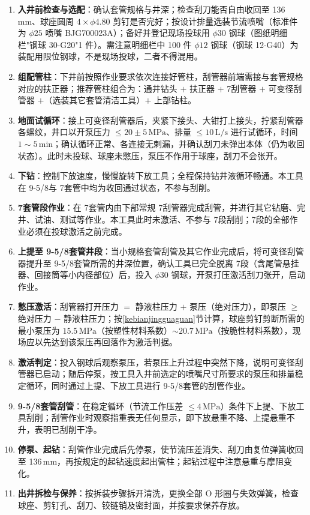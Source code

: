 \begin{enumerate}[label=(\arabic*),leftmargin=2em,itemsep=2pt]
	\item \textbf{入井前检查与选配}：确认套管规格与井深；检查刮刀能否自由收回至 136\,mm、球座圆周 $4\times\phi 4.80$ 剪钉是否完好；按设计排量选装节流喷嘴（标准件为 $\phi 25$ 喷嘴 BJG700023A）；备好并登记现场投球用 $\phi 30$ 钢球（图纸明细栏"钢球 30-G20"1 件）。需注意明细栏中 100 件 $\phi 12$ 钢球（钢球 12-G40）为装配用限位钢球，不是现场投球，二者不得混用。
	\item \textbf{组配管柱}：下井前按照作业要求依次连接好管柱，刮管器前端需接与套管规格对应的扶正器；推荐管柱组合为：通井钻头 $+$ 扶正器 $+$ 7\inch 刮管器 $+$ 可变径刮管器 $+$（选装其它套管清洁工具）$+$ 上部钻柱。
	\item \textbf{地面试循环}：接上可变径刮管器后，夹紧下接头、大钳打上接头，拧紧刮管器各螺纹，井口以开泵压力 $\le 20 \pm 5\,\mathrm{MPa}$、排量 $\le 10\,\mathrm{L/s}$ 进行试循环，时间 $1 \sim 5\,\mathrm{min}$；确认循环正常、各连接无刺漏，并确认刮刀未弹出本体（仍为收回状态）。此时未投球、球座未憋压，泵压不作用于球座，刮刀不会张开。
	\item \textbf{下钻}：控制下放速度，慢慢旋转下放工具；全程保持钻井液循环畅通。本工具在 9-5/8\inch 与 7\inch 套管中均为收回通过状态，不参与刮削。
	\item \textbf{7\inch 套管段作业}：在 7\inch 套管内由下部常规 7\inch 刮管器完成刮管，并进行其它钻磨、完井、试油、测试等作业。本工具此时未激活、不参与 7\inch 段刮削；7\inch 段的全部作业必须在投球激活之前完成。
	\item \textbf{上提至 9-5/8\inch 套管井段}：当小规格套管刮管及其它作业完成后，将可变径刮管器提升至 9-5/8\inch 套管所需的井深位置，确认工具已完全脱离 7\inch 段（含尾管悬挂器、回接筒等小内径部位）后，投入 $\phi 30$ 钢球，开泵打压激活刮刀张开，启动作业。
	\item \textbf{憋压激活}：刮管器打开压力 $=$ 静液柱压力 $+$ 泵压（绝对压力），即泵压 $\ge$ 绝对压力 $-$ 静液柱压力；按\ref{kebianjingguaguan}节计算，球座剪钉剪断所需的最小泵压为 $15.5\,\mathrm{MPa}$（按塑性材料系数）$\sim 20.7\,\mathrm{MPa}$（按脆性材料系数），现场应以先达到该泵压再回落作为激活判据。
	\item \textbf{激活判定}：投入钢球后观察泵压，若泵压上升过程中突然下降，说明可变径刮管器已启动；随后停泵，按工具入井前选定的喷嘴尺寸所要求的泵压和排量稳定循环，同时通过上提、下放工具进行 9-5/8\inch 套管的刮管作业。
	\item \textbf{9-5/8\inch 套管刮管}：在稳定循环（节流工作压差 $\le 4\,\mathrm{MPa}$）条件下上提、下放工具刮削；刮管作业时观察指重表无任何显示，即下放悬重不降、上提悬重不升，表明已刮削干净。
	\item \textbf{停泵、起钻}：刮管作业完成后先停泵，使节流压差消失、刮刀由复位弹簧收回至 136\,mm，再按规定的起钻速度起出管柱；起钻过程中注意悬重与摩阻变化。
	\item \textbf{出井拆检与保养}：按拆装步骤拆开清洗，更换全部 O 形圈与失效弹簧，检查球座、剪钉孔、刮刀、铰链销及密封面，并按要求保养存放。
\end{enumerate}

